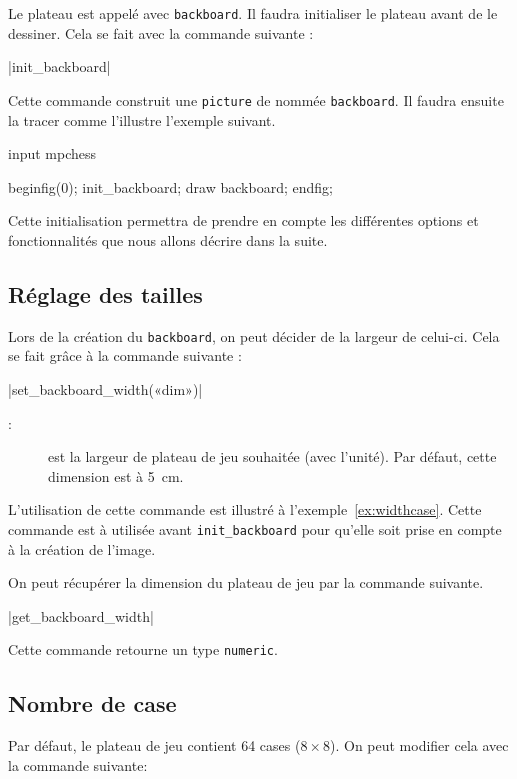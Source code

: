 \documentclass[french]{ltxdoc}
\begin{document}
Le plateau est appelé avec \mpchess{} \lstinline+backboard+.
Il faudra initialiser le plateau avant de le dessiner. Cela se fait avec la
commande suivante :\par

\commande|init_backboard|\smallskip{}


Cette commande construit une \lstinline+picture+ de \MP{} nommée
\mbox{\lstinline+backboard+.} Il faudra ensuite la tracer comme l’illustre l’exemple
suivant.

\begin{ExempleMP}
input mpchess

beginfig(0);
init_backboard;
draw backboard;
endfig;
\end{ExempleMP}

Cette initialisation permettra de prendre en compte les différentes options et
fonctionnalités que nous allons décrire dans la suite.
\subsection{Réglage des tailles}
Lors de la création du \lstinline+backboard+, on peut décider de la largeur de celui-ci. Cela se fait grâce à la commande suivante :\par\bigskip

\commande|set_backboard_width(«dim»)|\smallskip{}

\begin{description}
  \item[:] est la largeur de plateau de jeu souhaitée (avec l’unité). Par défaut, cette dimension est à \SI{5}{cm}.
\end{description}

L’utilisation de cette commande est illustré à l’exemple~\ref{ex:widthcase}. Cette commande est à utilisée avant \lstinline+init_backboard+ pour qu’elle soit prise en compte à la création de l’image.
\bigskip

On peut récupérer la dimension du plateau de jeu par la commande suivante.

\commande|get_backboard_width|\smallskip{}

Cette commande retourne un type \lstinline+numeric+.

\subsection{Nombre de case}
Par défaut, le plateau de jeu contient 64 cases ($8\times 8$). On peut modifier
cela avec la commande suivante:
\end{document}

